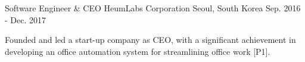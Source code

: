 \begin{cventries}
\cventry
{Software Engineer \& CEO} %
{HeumLabs Corporation} %
{Seoul, South Korea} %
{Sep. 2016 - Dec. 2017} %
{ %
\begin{cvitems}
\item {Founded and led a start-up company as CEO, with a significant achievement in developing an office automation system for streamlining office work [P1].}
\end{cvitems}
}




\end{cventries}
